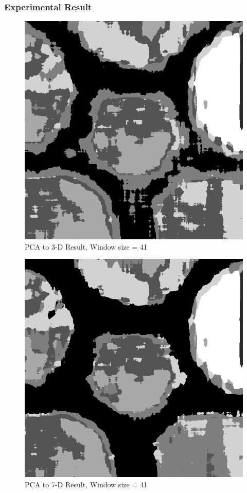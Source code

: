 \documentclass[11pt]{article}
\begin{document}
\subsubsection{Experimental Result}

\begin{figure}[!htp]
	\centering
	\includegraphics[scale=0.4]{texture_seg_pca_3.png}
	\caption{PCA to 3-D Result, Window size = 41}
	\label{texture_seg_pca_3}
	\end{figure}
	
\begin{figure}[!htp]
	\centering
	\includegraphics[scale=0.4]{texture_seg_pca_7.png}
	\caption{PCA to 7-D Result, Window size = 41}
	\label{texture_seg_pca_7}
	\end{figure}
	
\end{document}
